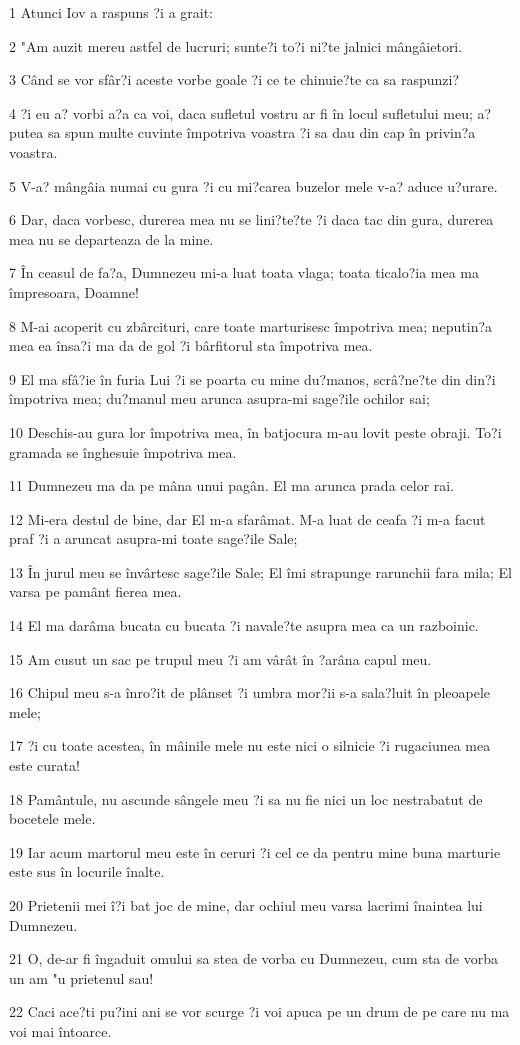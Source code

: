 \par 1 Atunci Iov a raspuns ?i a grait:
\par 2 "Am auzit mereu astfel de lucruri; sunte?i to?i ni?te jalnici mângâietori.
\par 3 Când se vor sfâr?i aceste vorbe goale ?i ce te chinuie?te ca sa raspunzi?
\par 4 ?i eu a? vorbi a?a ca voi, daca sufletul vostru ar fi în locul sufletului meu; a? putea sa spun multe cuvinte împotriva voastra ?i sa dau din cap în privin?a voastra.
\par 5 V-a? mângâia numai cu gura ?i cu mi?carea buzelor mele v-a? aduce u?urare.
\par 6 Dar, daca vorbesc, durerea mea nu se lini?te?te ?i daca tac din gura, durerea mea nu se departeaza de la mine.
\par 7 În ceasul de fa?a, Dumnezeu mi-a luat toata vlaga; toata ticalo?ia mea ma împresoara, Doamne!
\par 8 M-ai acoperit cu zbârcituri, care toate marturisesc împotriva mea; neputin?a mea ea însa?i ma da de gol ?i bârfitorul sta împotriva mea.
\par 9 El ma sfâ?ie în furia Lui ?i se poarta cu mine du?manos, scrâ?ne?te din din?i împotriva mea; du?manul meu arunca asupra-mi sage?ile ochilor sai;
\par 10 Deschis-au gura lor împotriva mea, în batjocura m-au lovit peste obraji. To?i gramada se înghesuie împotriva mea.
\par 11 Dumnezeu ma da pe mâna unui pagân. El ma arunca prada celor rai.
\par 12 Mi-era destul de bine, dar El m-a sfarâmat. M-a luat de ceafa ?i m-a facut praf ?i a aruncat asupra-mi toate sage?ile Sale;
\par 13 În jurul meu se învârtesc sage?ile Sale; El îmi strapunge rarunchii fara mila; El varsa pe pamânt fierea mea.
\par 14 El ma darâma bucata cu bucata ?i navale?te asupra mea ca un razboinic.
\par 15 Am cusut un sac pe trupul meu ?i am vârât în ?arâna capul meu.
\par 16 Chipul meu s-a înro?it de plânset ?i umbra mor?ii s-a sala?luit în pleoapele mele;
\par 17 ?i cu toate acestea, în mâinile mele nu este nici o silnicie ?i rugaciunea mea este curata!
\par 18 Pamântule, nu ascunde sângele meu ?i sa nu fie nici un loc nestrabatut de bocetele mele.
\par 19 Iar acum martorul meu este în ceruri ?i cel ce da pentru mine buna marturie este sus în locurile înalte.
\par 20 Prietenii mei î?i bat joc de mine, dar ochiul meu varsa lacrimi înaintea lui Dumnezeu.
\par 21 O, de-ar fi îngaduit omului sa stea de vorba cu Dumnezeu, cum sta de vorba un am "u prietenul sau!
\par 22 Caci ace?ti pu?ini ani se vor scurge ?i voi apuca pe un drum de pe care nu ma voi mai întoarce.

